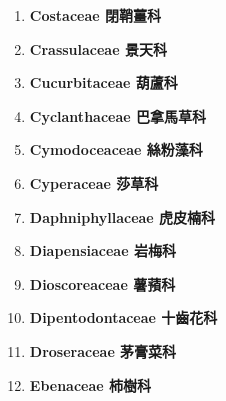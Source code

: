 \begin{enumerate}
        
      \item[] \begin{small}\textbf{Costaceae 閉鞘薑科} \end{small}
        
      \item[] \begin{small}\textbf{Crassulaceae 景天科} \end{small}
        
      \item[] \begin{small}\textbf{Cucurbitaceae 葫蘆科} \end{small}
        
      \item[] \begin{small}\textbf{Cyclanthaceae 巴拿馬草科} \end{small}
        
      \item[] \begin{small}\textbf{Cymodoceaceae 絲粉藻科} \end{small}
        
      \item[] \begin{small}\textbf{Cyperaceae 莎草科} \end{small}
        
      \item[] \begin{small}\textbf{Daphniphyllaceae 虎皮楠科} \end{small}
        
      \item[] \begin{small}\textbf{Diapensiaceae 岩梅科} \end{small}
        
      \item[] \begin{small}\textbf{Dioscoreaceae 薯蕷科} \end{small}
        
      \item[] \begin{small}\textbf{Dipentodontaceae 十齒花科} \end{small}
        
      \item[] \begin{small}\textbf{Droseraceae 茅膏菜科} \end{small}
        
      \item[] \begin{small}\textbf{Ebenaceae 柿樹科} \end{small}

\end{enumerate}
